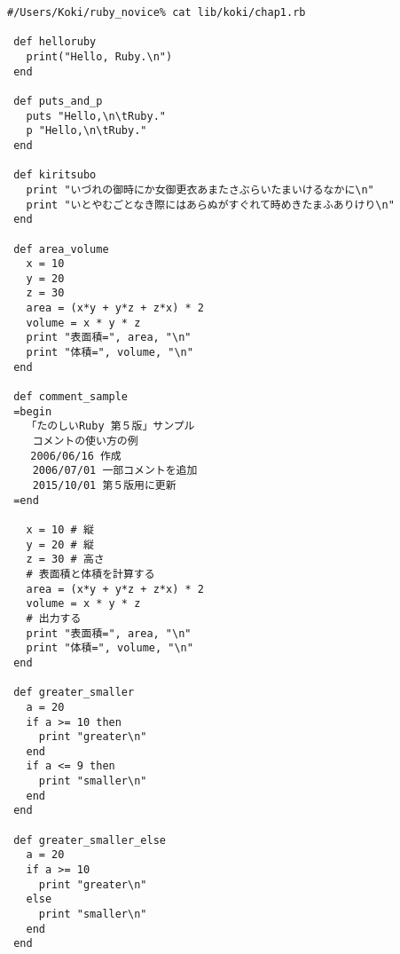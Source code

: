 \begin{lstlisting}[style=customRuby,basicstyle={\scriptsize\ttfamily}]
 #/Users/Koki/ruby_novice% cat lib/koki/chap1.rb
 
 def helloruby     
   print("Hello, Ruby.\n")
 end
 
 def puts_and_p
   puts "Hello,\n\tRuby."
   p "Hello,\n\tRuby."
 end
 
 def kiritsubo
   print "いづれの御時にか女御更衣あまたさぶらいたまいけるなかに\n"
   print "いとやむごとなき際にはあらぬがすぐれて時めきたまふありけり\n"
 end
 
 def area_volume
   x = 10
   y = 20
   z = 30
   area = (x*y + y*z + z*x) * 2
   volume = x * y * z
   print "表面積=", area, "\n"
   print "体積=", volume, "\n"
 end
 
 def comment_sample
 =begin                                                                          
   「たのしいRuby 第５版」サンプル                                               
    コメントの使い方の例                                                         
  　2006/06/16 作成                                                              
    2006/07/01 一部コメントを追加                                                
    2015/10/01 第５版用に更新                                                    
 =end
 
   x = 10 # 縦                                                                   
   y = 20 # 縦                                                                   
   z = 30 # 高さ                                                                 
   # 表面積と体積を計算する                                                      
   area = (x*y + y*z + z*x) * 2
   volume = x * y * z
   # 出力する                                                                    
   print "表面積=", area, "\n"
   print "体積=", volume, "\n"
 end
 
 def greater_smaller
   a = 20
   if a >= 10 then
     print "greater\n"
   end
   if a <= 9 then
     print "smaller\n"
   end
 end
 
 def greater_smaller_else
   a = 20
   if a >= 10
     print "greater\n"
   else
     print "smaller\n"
   end
 end
\end{lstlisting}
